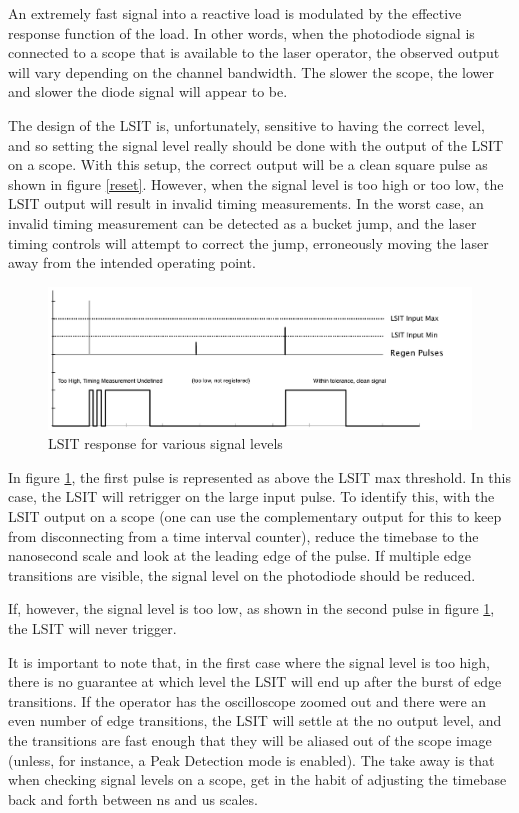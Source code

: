 \documentclass{article}
\begin{document}
An extremely fast signal into a reactive load is modulated by the effective response function of the load. In other words, when the photodiode signal is connected to a scope that is available to the laser operator, the observed output will vary depending on the channel bandwidth. The slower the scope, the lower and slower the diode signal will appear to be.

The design of the LSIT is, unfortunately, sensitive to having the correct level, and so setting the signal level really should be done with the output of the LSIT on a scope. With this setup, the correct output will be a clean square pulse as shown in figure \ref{reset}. However, when the signal level is too high or too low, the LSIT output will result in invalid timing measurements. In the worst case, an invalid timing measurement can be detected as a bucket jump, and the laser timing controls will attempt to correct the jump, erroneously moving the laser away from the intended operating point.

\begin{figure}[h]
    \includegraphics[width=\textwidth]{rsc/LSIT_signalrange.pdf}
    \caption{LSIT response for various signal levels}\label{signallevels}
    \end{figure}
    
In figure \ref{signallevels}, the first pulse is represented as above the LSIT max threshold. In this case, the LSIT will retrigger on the large input pulse. To identify this, with the LSIT output on a scope (one can use the complementary output for this to keep from disconnecting from a time interval counter), reduce the timebase to the nanosecond scale and look at the leading edge of the pulse. If multiple edge transitions are visible, the signal level on the photodiode should be reduced.

If, however, the signal level is too low, as shown in the second pulse in figure \ref{signallevels}, the LSIT will never trigger.

It is important to note that, in the first case where the signal level is too high, there is no guarantee at which level the LSIT will end up after the burst of edge transitions. If the operator has the oscilloscope zoomed out and there were an even number of edge transitions, the LSIT will settle at the no output level, and the transitions are fast enough that they will be aliased out of the scope image (unless, for instance, a Peak Detection mode is enabled). The take away is that when checking signal levels on a scope, get in the habit of adjusting the timebase back and forth between ns and us scales.
\end{document}
